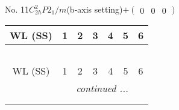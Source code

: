 \documentclass[fleqn,9pt,landscape]{jsarticle}
\begin{document}
\newpage
No. 11\quad$C_{2h}^{2}$\quad$P2_1/m$\quad(b-axis setting)\quad[ monoclinic ]\quad$+\begin{pmatrix} 0 & 0 & 0 \end{pmatrix}$
\begin{center}
\renewcommand{\arraystretch}{1.2}
\begin{longtable}{ccccccc}
 \hline \hline
WL (SS) & 1 & 2 & 3 & 4 & 5 & 6 \\ \hline \endfirsthead

\multicolumn{6}{l}{\tablename\ \thetable{}} \\
 \hline \hline
WL (SS) & 1 & 2 & 3 & 4 & 5 & 6 \\ \hline \endhead

 \hline \hline
\multicolumn{6}{r}{\footnotesize\it continued ...} \\ \endfoot

 \hline \hline
\multicolumn{6}{r}{} \\ \endlastfoot


\end{longtable}
\end{center}
\end{document}
